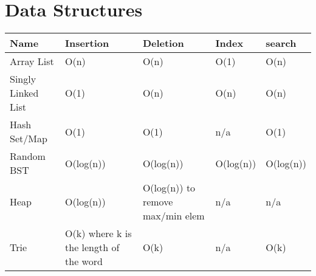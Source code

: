 \section{Data Structures}
\begin{center}
\begin{longtable}{|l|p{3cm}|l|l|l|}
\hline
\textbf{Name} & \textbf{Insertion} & \textbf{Deletion} & \textbf{Index} & \textbf{search} \\
\hline 

Array List & O(n) & O(n) & O(1) & O(n) \\

\hline

Singly Linked List & O(1) & O(n) & O(n) & O(n) \\

\hline

Hash Set/Map & O(1) & O(1) & n/a & O(1) \\

\hline 

Random BST & O(log(n)) & O(log(n)) & O(log(n)) & O(log(n)) \\

\hline 

Heap & O(log(n)) & O(log(n)) to remove max/min elem & n/a & n/a \\

\hline 

Trie & O(k) where k is the length of the word & O(k) & n/a &  O(k) \\

\hline

\end{longtable}
\end{center}